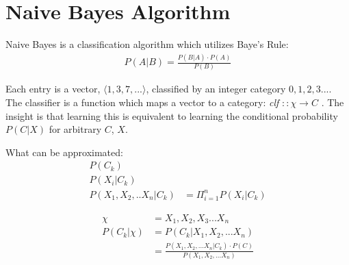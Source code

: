 \documentclass[12pt]{article}
\begin{document}
\section{Naive Bayes Algorithm}
Naive Bayes is a classification algorithm which utilizes Baye's Rule:
\begin{align}
  P(A | B) = \frac{P(B | A) \cdot P(A)}{P(B)}
\end{align}

Each entry is a vector, $\langle 1, 3, 7, ... \rangle$, classified by
an integer category $0, 1, 2, 3 ... $. The classifier is a function
which maps a vector to a category: \textit{clf} $:: \chi \rightarrow C$ .
The insight is that learning this is equivalent to learning
the conditional probability $P(C | X)$ for arbitrary $C$, $X$.

What can be approximated:
\begin{align}
  P(C_k) &\\
  P(X_i | C_k) &\\
  P(X_1, X_2, .. X_n | C_k) &= \Pi^n_{i =1} P(X_i | C_k)  
\end{align}

\begin{align}
  \chi &= X_1, X_2, X_3 ... X_n \\
  P(C_k | \chi) &= P (C_k | X_1, X_2, ... X_n) \\
  &= \frac{P(X_1, X_2, ... X_n | C_k) \cdot P(C)}{P(X_1, X_2, ... X_n)}
\end{align}
\end{document}
